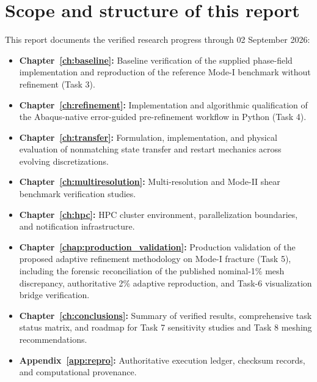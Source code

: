 \section{Scope and structure of this report}
This report documents the verified research progress through 02 September 2026:
\begin{itemize}
  \item \textbf{Chapter~\ref{ch:baseline}:} Baseline verification of the supplied phase-field implementation and reproduction of the reference Mode-I benchmark without refinement (Task 3).
  \item \textbf{Chapter~\ref{ch:refinement}:} Implementation and algorithmic qualification of the Abaqus-native error-guided pre-refinement workflow in Python (Task 4).
  \item \textbf{Chapter~\ref{ch:transfer}:} Formulation, implementation, and physical evaluation of nonmatching state transfer and restart mechanics across evolving discretizations.
  \item \textbf{Chapter~\ref{ch:multiresolution}:} Multi-resolution and Mode-II shear benchmark verification studies.
  \item \textbf{Chapter~\ref{ch:hpc}:} HPC cluster environment, parallelization boundaries, and notification infrastructure.
  \item \textbf{Chapter~\ref{chap:production_validation}:} Production validation of the proposed adaptive refinement methodology on Mode-I fracture (Task 5), including the forensic reconciliation of the published nominal-1\% mesh discrepancy, authoritative 2\% adaptive reproduction, and Task-6 visualization bridge verification.
  \item \textbf{Chapter~\ref{ch:conclusions}:} Summary of verified results, comprehensive task status matrix, and roadmap for Task 7 sensitivity studies and Task 8 meshing recommendations.
  \item \textbf{Appendix~\ref{app:repro}:} Authoritative execution ledger, checksum records, and computational provenance.
\end{itemize}
